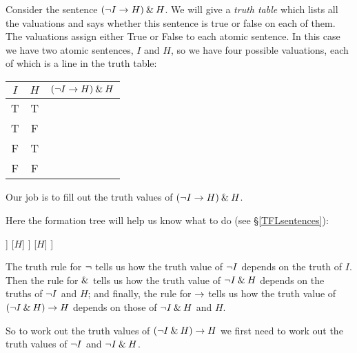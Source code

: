 Consider the sentence $(\neg I\rightarrow H)\mathbin{\&} H$. We will give a \emph{truth table} which lists all the valuations and says whether this sentence is true or false on each of them.
The valuations assign either True or False to each atomic sentence. In this case we have two atomic sentences, $I$ and $H$, so we have four possible valuations, each of which is a line in the truth table:
\begin{center}
\begin{tabular}{cc|c}
$I$&$H$&$(\neg I\rightarrow H)\mathbin{\&} H$\\\hline
T&T&\\
T&F&\\
F&T&\\
F&F&
\end{tabular}
\end{center}
Our job is to fill out the truth values of $(\neg I\rightarrow H)\mathbin{\&} H$.

Here the formation tree will help us know what to do (see \S\ref{TFLsentences}):
\begin{center}
\begin{forest}
[$(\enot I\eand H)\eif H$
	[$(\enot I\eand H)$
		[$\enot I$
			[$I$]
		]
		[$H$]
	]
	[$H$]
]
\end{forest}
\end{center}
The truth rule for $\neg$ tells us how the truth value of $\enot I$ depends on the truth of $I$. Then the rule for $\mathbin{\&}$ tells us how the truth value of $\neg I\mathbin{\&} H$ depends on the truths of $\enot I$ and $H$; and finally, the rule for $\rightarrow$ tells us how the truth value of $(\enot I\eand H)\eif H$ depends on those of $\neg I\mathbin{\&} H$ and $H$.

So to work out the truth values of $(\enot I\eand H)\eif H$ we first need to work out the truth values of $\enot I$ and $\neg I\mathbin{\&} H$.

